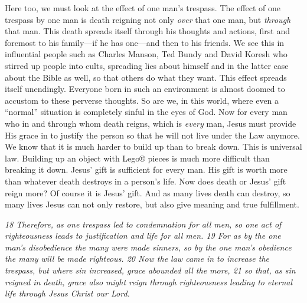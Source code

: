 Here too, we must look at the effect of one man's trespass. The effect
of one trespass by one man is death reigning not only \emph{over} that
one man, but \emph{through} that man. This death spreads itself through
his thoughts and actions, first and foremost to his family---if he has
one---and then to his friends. We see this in influential people such as
Charles Manson, Ted Bundy and David Koresh who stirred up people into
cults, spreading lies about himself and in the latter case about the
Bible as well, so that others do what they want. This effect spreads
itself unendingly. Everyone born in such an environment is almost doomed
to accustom to these perverse thoughts. So are we, in this world, where
even a ``normal'' situation is completely sinful in the eyes of God. Now
for every man who in and through whom death reigns, which is
\emph{every} man, Jesus must provide His grace in to justify the person
so that he will not live under the Law anymore. We know that it is much
harder to build up than to break down. This is universal law. Building
up an object with Lego® pieces is much more difficult than breaking it
down. Jesus' gift is sufficient for every man. His gift is worth more
than whatever death destroys in a person's life. Now does death or
Jesus' gift reign more? Of course it is Jesus' gift. And as many lives
death can destroy, so many lives Jesus can not only restore, but also
give meaning and true fulfillment.

\emph{18 Therefore, as one trespass led to condemnation for all men, so
one act of righteousness leads to justification and life for all men. 19
For as by the one man's disobedience the many were made sinners, so by
the one man's obedience the many will be made righteous. 20 Now the law
came in to increase the trespass, but where sin increased, grace
abounded all the more, 21 so that, as sin reigned in death, grace also
might reign through righteousness leading to eternal life through Jesus
Christ our Lord.}

